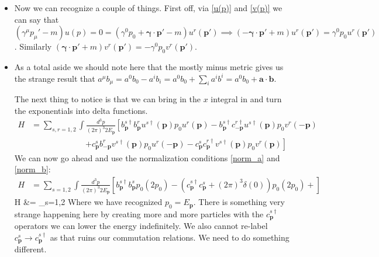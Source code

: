 \documentclass[11pt]{article}
\renewenvironment{flalign}{\vspace{-2mm}\empheq[box=\tcbhighmath]{align}}{\endempheq}
\numberwithin{equation}{section}
\begin{document}
     \begin{itemize}
       \item  Now we can recognize a couple of things. First off, via \ref{u(p)} and \ref{v(p)} we can say that $(\gamma^{\mu}p_{\mu}'-m)u(p)= 0 = (\gamma^{0}p_{0}+\boldsymbol{\gamma}\cdot \textbf{p}' -m)u^{r}(\textbf{p}') \implies  (-\boldsymbol{\gamma}\cdot \textbf{p}' +m)u^{r}(\textbf{p}') = \gamma^{0}p_0u^{r}(\textbf{p}')$. Similarly $(\boldsymbol{\gamma}\cdot \textbf{p}' +m)v^{r}(\textbf{p}') = -\gamma^{0}p_0v^{r}(\textbf{p}')$. 

       \item As a total aside we should note here that the mostly minus metric gives us the strange result that $a^{\mu}b_{\mu} = a^0b_0-a^{i}b_{i} =a^0b_0+\sum_ia^{i}b^{i} =a^0b_0+\textbf{a}\cdot\textbf{b}$.

       The next thing to notice is that we can bring in the $x$ integral in and turn the exponentials into delta functions. 
       \begin{align*}
         H &= \sum_{s,r=1,2}\int \frac{d^3p}{(2\pi)^3 2E_{\textbf{p}}}\left[b^{s \dagger}_{\textbf{p}}b^{r}_{\textbf{p}}u^{s\dagger}(\textbf{p})p_0u^{r}(\textbf{p})-b^{s\dagger}_{\textbf{p}}c^{r\dagger}_{-\textbf{p}}u^{s\dagger}(\textbf{p})p_0v^{r}(-\textbf{p})\right. \\
      &~~~~~~~~~~~~~~~~~~~~~~~~~~~~~~\left.+c^{s}_{\textbf{p}}b^{r}_{-\textbf{p}}v^{s\dagger}(\textbf{p})p_0u^{r}(-\textbf{p})-c^{s}_{\textbf{p}}c^{r\dagger}_{\textbf{p}}v^{s\dagger}(\textbf{p})p_0v^{r}(\textbf{p})\right]
       \end{align*}
       We can now go ahead and use the normalization conditions \ref{norm_a} and \ref{norm_b}: 
       \begin{align*}
          H &= \sum_{s=1,2}\int \frac{d^3p}{(2\pi)^3 2E_{\textbf{p}}}\left[b^{s \dagger}_{\textbf{p}}b^{s}_{\textbf{p}}p_0(2p_0)-(c^{s\dagger}_{\textbf{p}}c^{s}_{\textbf{p}}+(2\pi)^3\delta(0))p_0(2p_0)+\right]
        \end{align*}
        \begin{flalign}
        \label{Ham_D}
           \implies H  &= \sum_{s=1,2}\int {}
         \end{flalign} 
         Where we have recognized $p_0 = E_{\textbf{p}}$. There is something very strange happening here by creating more and more particles with the $c^{s\dagger}_{\textbf{p}}$ operators we can lower the energy indefinitely. We also cannot re-label $c^{s}_{\textbf{p}}\rightarrow c^{s\dagger}_{\textbf{p}}$ as that ruins our commutation relations. We need to do something different.  
     \end{itemize}
\end{document}
